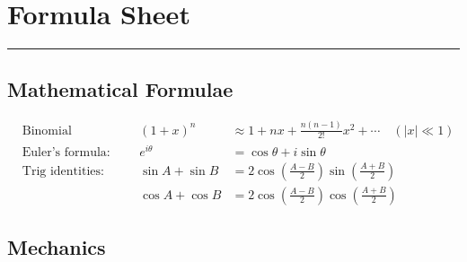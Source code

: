 
\newpage
\section*{Formula Sheet}
\noindent\rule{\textwidth}{0.4pt}

\subsection*{Mathematical Formulae}

\begin{align*}
&\text{Binomial expansion:} & (1+x)^n &\approx 1 + nx + \frac{n(n-1)}{2!}x^2 + \cdots \quad (|x| \ll 1) \\[4pt]
&\text{Euler's formula:} & e^{i\theta} &= \cos\theta + i\sin\theta \\[4pt]
&\text{Trig identities:} & \sin A + \sin B &= 2\cos\!\left(\tfrac{A-B}{2}\right)\sin\!\left(\tfrac{A+B}{2}\right) \\
& & \cos A + \cos B &= 2\cos\!\left(\tfrac{A-B}{2}\right)\cos\!\left(\tfrac{A+B}{2}\right)
\end{align*}

\subsection*{Mechanics}

